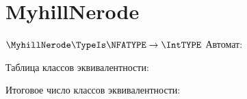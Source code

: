 \section{MyhillNerode}
\begin{frame}{$\MyhillNerode\TypeIs\NFATYPE\to\IntTYPE$}
	Автомат:


	Таблица классов эквивалентности:


	Итоговое число классов эквивалентности:

\end{frame}
